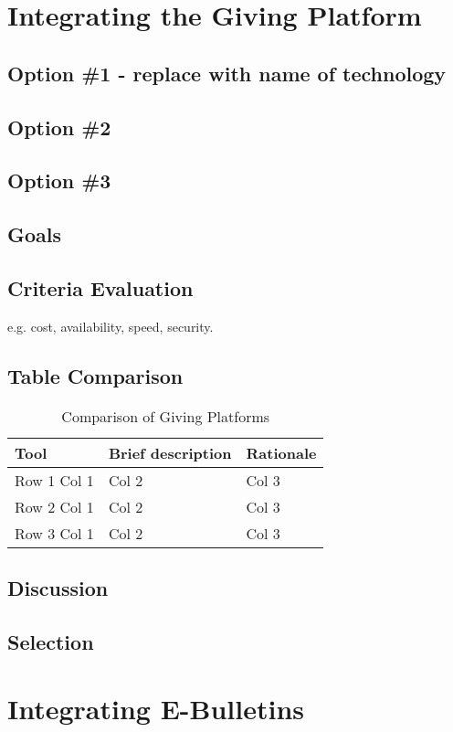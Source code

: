 \documentclass[letterpaper,10pt,draftclsnofoot,onecolumn,titlepage]{IEEEtran}
\begin{document}
	\section{Integrating the Giving Platform}
	\subsection{Option \#1 - replace with name of technology}
	\subsection{Option \#2}
	\subsection{Option \#3}
	\subsection{Goals}
	\subsection{Criteria Evaluation}
	e.g. cost, availability, speed, security.
	\subsection{Table Comparison}
	\begin{table}[ht]
	\caption{Comparison of Giving Platforms}
	\begin{center}
	\begin{tabular} { | m{3cm} | m{5cm} | m{5cm} | }
	\hline\hline
	Tool & Brief description & Rationale \\ [0.5ex]
	\hline
	Row 1 Col 1 & Col 2 & Col 3 \\
	\hline
	Row 2 Col 1 & Col 2 & Col 3 \\
	\hline
	Row 3 Col 1 & Col 2 & Col 3 \\
	\hline
	\end{tabular}
	\end{center}
	\end{table}
	\subsection{Discussion}
	\subsection{Selection}

	\section{Integrating E-Bulletins}
\end{document}
